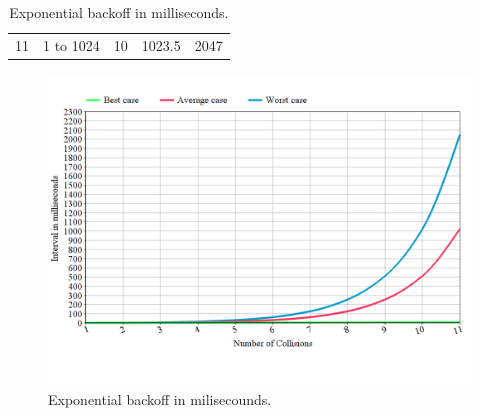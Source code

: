 \begin{table}[ht!]
\begin{tabular}{ l l l l l }
\multicolumn{1}{l}{11}                       & \multicolumn{1}{l}{1 to 1024} & \multicolumn{1}{l}{10} & \multicolumn{1}{l}{1023.5} & 2047       \\ 
\end{tabular}
\caption{Exponential backoff in milliseconds.}
\label{table:expbackoff}
\end{table}

\begin{figure}[H]
\centering
	\includegraphics[width=1.0\textwidth]{figures/backoff.PNG}
	\caption{Exponential backoff in milisecounds.}
	\label{fig:expbackoff}
\end{figure}